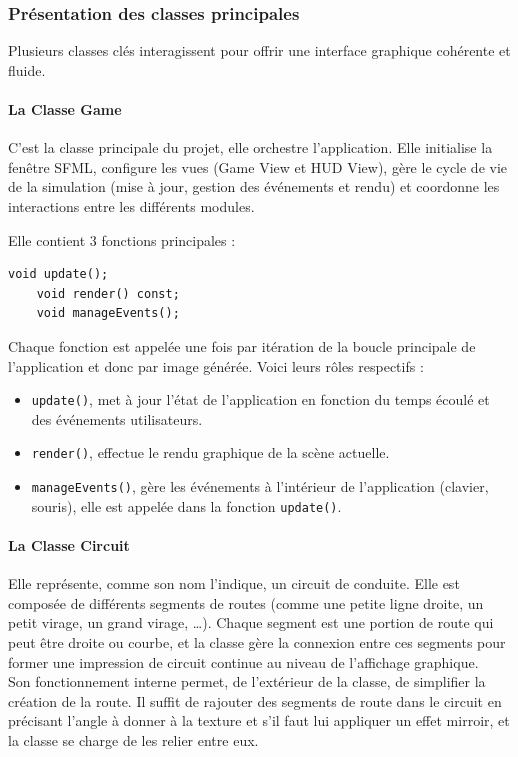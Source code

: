 \subsubsection{Présentation des classes principales}\label{subsubsec:presentation-des-classes-principales}
Plusieurs classes clés interagissent pour offrir une interface graphique cohérente et fluide.

\paragraph[Game]{La Classe \textbf{Game}}\label{par:class_game}
C'est la classe principale du projet, elle orchestre l'application.
Elle initialise la fenêtre SFML, configure les vues (Game View et HUD View), gère le cycle de vie de la simulation (mise à jour, gestion des événements et rendu) et coordonne les interactions entre les différents modules.

Elle contient 3 fonctions principales :
\begin{lstlisting}[style=CStyle, label={lst:game_class}]
    void update();
    void render() const;
    void manageEvents();
\end{lstlisting}
Chaque fonction est appelée une fois par itération de la boucle principale de l'application et donc par image générée.
Voici leurs rôles respectifs :
\begin{itemize}
    \item \texttt{update()}, met à jour l'état de l'application en fonction du temps écoulé et des événements utilisateurs.
    \item \texttt{render()}, effectue le rendu graphique de la scène actuelle.
    \item \texttt{manageEvents()}, gère les événements à l'intérieur de l'application (clavier, souris), elle est appelée dans la fonction \texttt{update()}.
\end{itemize}

\paragraph[Circuit]{La Classe \textbf{Circuit}}
Elle représente, comme son nom l'indique, un circuit de conduite.
Elle est composée de différents segments de routes (comme une petite ligne droite, un petit virage, un grand virage, \dots).
Chaque segment est une portion de route qui peut être droite ou courbe, et la classe gère la connexion entre ces segments pour former une impression de circuit continue au niveau de l'affichage graphique. \\
Son fonctionnement interne permet, de l'extérieur de la classe, de simplifier la création de la route.
Il suffit de rajouter des segments de route dans le circuit en précisant l'angle à donner à la texture et s'il faut lui appliquer un effet mirroir, et la classe se charge de les relier entre eux.

